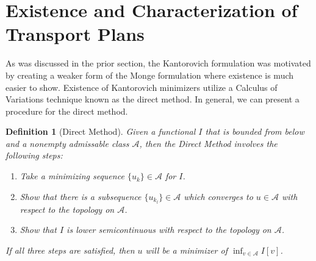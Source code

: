 \documentclass[12pt]{article}
\theoremstyle{plain}
\newtheorem{defn}{Definition}[section]
\numberwithin{equation}{section}
\begin{document}
\section{Existence and Characterization of Transport Plans}
As was discussed in the prior section, the Kantorovich formulation was motivated by creating a weaker form of the Monge formulation where existence is much easier to show. Existence of Kantorovich minimizers utilize a Calculus of Variations technique known as the direct method.
In general, we can present a procedure for the direct method.
\begin{defn}[Direct Method]\label{defn:direct}
  Given a functional $I$ that is bounded from below and a nonempty admissable class $\mathcal{A}$, then the Direct Method involves the following steps:
  \begin{enumerate}
    \item Take a minimizing sequence $\{u_k\}\in \mathcal{A}$ for $I$.
    \item Show that there is a subsequence $\{u_{k_l}\}\in \mathcal{A}$ which converges to $u\in \mathcal{A}$ with respect to the topology on $\mathcal{A}$.
    \item Show that $I$ is lower semicontinuous with respect to the topology on $\mathcal{A}$.
  \end{enumerate}
  If all three steps are satisfied, then $u$ will be a minimizer of $\inf_{v\in\mathcal{A}} I[v]$.
\end{defn}
\end{document}
